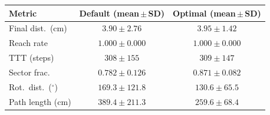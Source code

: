\begin{tabular}{lcc}
\toprule
  Metric & Default (mean\,$\pm$\,SD) & Optimal (mean\,$\pm$\,SD) \\
\midrule
  Final dist.\ (cm) & $3.90 \pm 2.76$ & $3.95 \pm 1.42$ \\
  Reach rate & $1.000 \pm 0.000$ & $1.000 \pm 0.000$ \\
  TTT (steps) & $308 \pm 155$ & $309 \pm 147$ \\
  Sector frac. & $0.782 \pm 0.126$ & $0.871 \pm 0.082$ \\
  Rot.\ dist.\ ($^\circ$) & $169.3 \pm 121.8$ & $130.6 \pm 65.5$ \\
  Path length (cm) & $389.4 \pm 211.3$ & $259.6 \pm 68.4$ \\
\bottomrule
\end{tabular}%